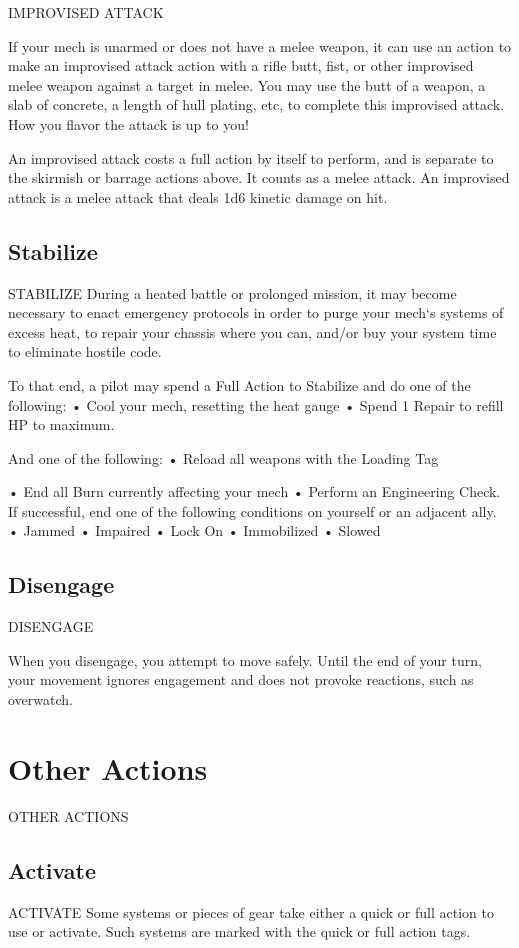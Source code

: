                                       IMPROVISED ATTACK

If your mech is unarmed or does not have a melee weapon, it can use an action to make an
improvised attack action with a rifle butt, fist, or other improvised melee weapon against a target
in melee. You may use the butt of a weapon, a slab of concrete, a length of hull plating, etc, to
complete this improvised attack. How you flavor the attack is up to you!


An improvised attack costs a full action by itself to perform, and is separate to the skirmish or
barrage actions above. It counts as a melee attack. An improvised attack is a melee attack that
deals 1d6 kinetic damage on hit.
\subsection{Stabilize}
                                              STABILIZE
During a heated battle or prolonged mission, it may become necessary to enact emergency
protocols in order to purge your mech‘s systems of excess heat, to repair your chassis where you
can, and/or buy your system time to eliminate hostile code.

To that end, a pilot may spend a Full Action to Stabilize and do one of the following:
•  Cool your mech, resetting the heat gauge
•  Spend 1 Repair to refill HP to maximum.

And one of the following:
•  Reload all weapons with the Loading Tag




•  End all Burn currently affecting your mech
•  Perform an Engineering Check. If successful, end one of the following conditions on yourself
  or an adjacent ally.
             •  Jammed
             •  Impaired
             •  Lock On
             •  Immobilized
             •  Slowed
\subsection{Disengage}
                                            DISENGAGE

When you disengage, you attempt to move safely. Until the end of your turn, your movement
ignores engagement and does not provoke reactions, such as overwatch.

\section{Other Actions} OTHER ACTIONS
\subsection{Activate}
                                             ACTIVATE
Some systems or pieces of gear take either a quick or full action to use or activate. Such
systems are marked with the quick or full action tags.

